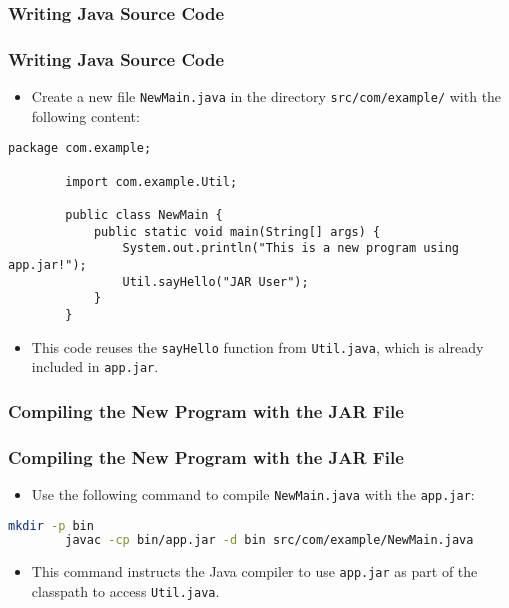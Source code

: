 \documentclass[aspectratio=169, table]{beamer}
\begin{document}
\subsubsection{Writing Java Source Code}

\begin{frame}[fragile]
	\frametitle{Writing Java Source Code}
	\begin{itemize}
		\item Create a new file \texttt{NewMain.java} in the directory \texttt{src/com/example/} with the following content:
	\end{itemize}
	\begin{lstlisting}[style=JavaStyle]
		package com.example;
		
		import com.example.Util;
		
		public class NewMain {
			public static void main(String[] args) {
				System.out.println("This is a new program using app.jar!");
				Util.sayHello("JAR User");
			}
		}
	\end{lstlisting}
	\begin{itemize}
		\item This code reuses the \texttt{sayHello} function from \texttt{Util.java}, which is already included in \texttt{app.jar}.
	\end{itemize}
\end{frame}

\subsubsection{Compiling the New Program with the JAR File}

\begin{frame}[fragile]
	\frametitle{Compiling the New Program with the JAR File}
	\begin{itemize}
		\item Use the following command to compile \texttt{NewMain.java} with the \texttt{app.jar}:
	\end{itemize}
	\begin{lstlisting}[language=bash]
		mkdir -p bin
		javac -cp bin/app.jar -d bin src/com/example/NewMain.java
	\end{lstlisting}
	\begin{itemize}
		\item This command instructs the Java compiler to use \texttt{app.jar} as part of the classpath to access \texttt{Util.java}.
	\end{itemize}
\end{frame}
\end{document}
